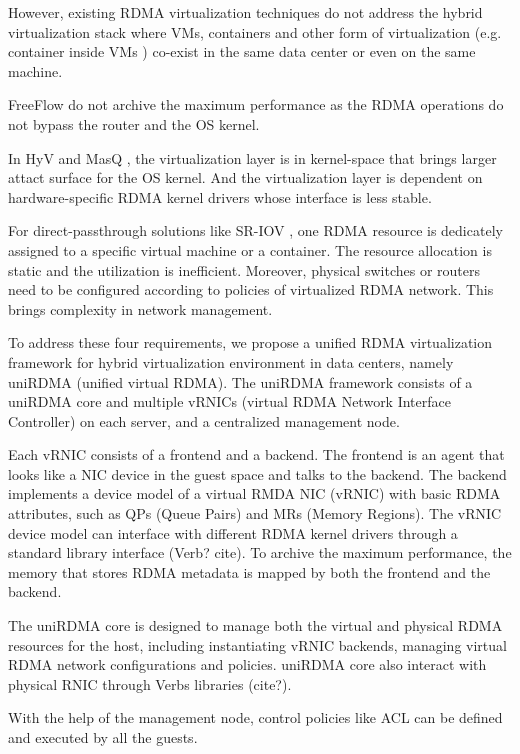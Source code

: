 However, existing RDMA virtualization techniques do not address the hybrid virtualization stack where VMs, containers and other form of virtualization (e.g. container inside VMs \cite{containeronvm}) co-exist in the same data center or even on the same machine.

FreeFlow \cite{kim2019freeflow} do not archive the maximum performance as the RDMA operations do not bypass the router and the OS kernel.

In HyV \cite{pfefferle2015hybrid} and MasQ \cite{he2020masq}, the virtualization layer is in kernel-space that brings larger attact surface for the OS kernel. And the virtualization layer is dependent on hardware-specific RDMA kernel drivers whose interface is less stable.

For direct-passthrough solutions like SR-IOV \cite{sr-iov}, one RDMA resource is dedicately assigned to a specific virtual machine or a container. The resource allocation is static and the utilization is inefficient. Moreover, physical switches or routers need to be configured according to policies of virtualized RDMA network. This brings complexity in network management.

To address these four requirements, we propose a unified RDMA virtualization framework for hybrid virtualization environment in data centers, namely uniRDMA (unified virtual RDMA). The uniRDMA framework consists of a uniRDMA core and multiple vRNICs (virtual RDMA Network Interface Controller) on each server, and a centralized management node.

Each vRNIC consists of a frontend and a backend. The frontend is an agent that looks like a NIC device in the guest space and talks to the backend. The backend implements a device model of a virtual RMDA NIC (vRNIC) with basic RDMA attributes, such as QPs (Queue Pairs) and MRs (Memory Regions). The vRNIC device model can interface with different RDMA kernel drivers through a standard library interface (Verb? cite). To archive the maximum performance, the memory that stores RDMA metadata is mapped by both the frontend and the backend. 

The uniRDMA core is designed to manage both the virtual and physical RDMA resources for the host, including instantiating vRNIC backends, managing virtual RDMA network configurations and policies. uniRDMA core also interact with physical RNIC through Verbs libraries (cite?).

With the help of the management node, control policies like ACL can be defined and executed by all the guests.

